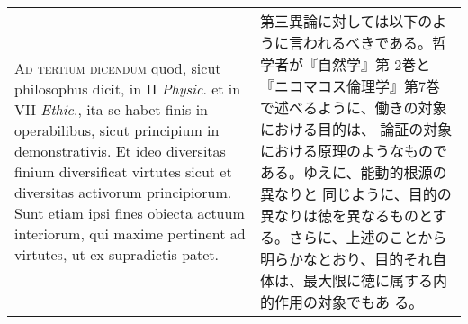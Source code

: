 \documentclass[10pt]{jsarticle} %
\begin{document}
\begin{longtable}{p{21em}p{21em}}
\\



{\scshape Ad tertium dicendum} quod, sicut philosophus dicit, in II
{\itshape Physic}. et in VII {\itshape Ethic}., ita se habet finis in
operabilibus, sicut principium in demonstrativis. Et ideo diversitas
finium diversificat virtutes sicut et diversitas activorum
principiorum. Sunt etiam ipsi fines obiecta actuum interiorum, qui
maxime pertinent ad virtutes, ut ex supradictis patet.

&

第三異論に対しては以下のように言われるべきである。哲学者が『自然学』第
2巻と『ニコマコス倫理学』第7巻で述べるように、働きの対象における目的は、
論証の対象における原理のようなものである。ゆえに、能動的根源の異なりと
同じように、目的の異なりは徳を異なるものとする。さらに、上述のことから
明らかなとおり、目的それ自体は、最大限に徳に属する内的作用の対象でもあ
る。


\end{longtable}
\newpage
\end{document}
